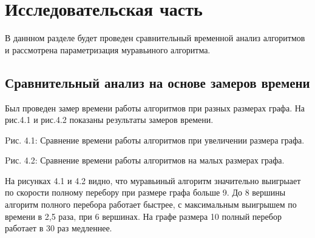 \documentclass[12pt]{report}
\begin{document}
\chapter{Исследовательская часть}
В даннном разделе будет проведен сравнительный временной анализ алгоритмов и рассмотрена параметризация муравьиного алгоритма.

\section{Сравнительный анализ на основе замеров времени}
Был проведен замер времени работы алгоритмов при разных размерах графа. На рис.4.1 и рис.4.2 показаны результаты замеров времени.


\begin{center}
Pис. 4.1: Сравнение времени работы алгоритмов при увеличении размера графа.
\end{center}

\begin{center}
Pис. 4.2: Сравнение времени работы алгоритмов на малых размерах графа.
\end{center}

На рисунках 4.1 и 4.2 видно, что муравьиный алгоритм значительно выигрыает по скорости полному перебору при размере графа больше 9.
До 8 вершины алгоритм полного перебора работает быстрее, с максимальным выигрышем по времени в 2,5 раза, при 6 вершинах.
На графе размера 10 полный перебор работает в 30 раз медленнее. 
\end{document}
